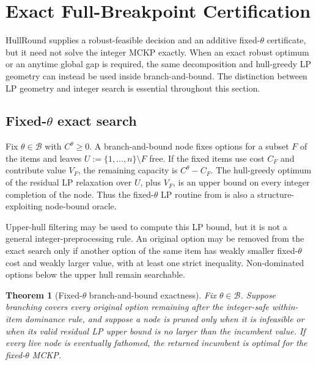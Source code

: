 \documentclass[11pt, a4paper]{article}
\theoremstyle{plain}
\newtheorem{theorem}{Theorem}
\theoremstyle{definition}
\theoremstyle{remark}
\begin{document}
\section{Exact Full-Breakpoint Certification}\label{sec:exact}

HullRound supplies a robust-feasible decision and an additive fixed-$\theta$
certificate, but it need not solve the integer MCKP exactly.  When an exact
robust optimum or an anytime global gap is required, the same decomposition and
hull-greedy LP geometry can instead be used inside branch-and-bound.  The
distinction between LP geometry and integer search is essential throughout this
section.

\subsection{Fixed-\texorpdfstring{$\theta$}{theta} exact search}

Fix $\theta\in\mathcal B$ with $C^\theta\ge0$.  A branch-and-bound node fixes
options for a subset $F$ of the items and leaves $U:=\{1,\ldots,n\}\setminus F$
free.  If the fixed items use cost $C_F$ and contribute value $V_F$, the
remaining capacity is $C^\theta-C_F$.  The hull-greedy optimum of the residual
LP relaxation over $U$, plus $V_F$, is an upper bound on every integer
completion of the node.  Thus the fixed-$\theta$ LP routine from
 is also a structure-exploiting node-bound oracle.

Upper-hull filtering may be used to compute this LP bound, but it is not a
general integer-preprocessing rule.  An original option may be removed from
the exact search only if another option of the same item has weakly smaller
fixed-$\theta$ cost and weakly larger value, with at least one strict
inequality.  Non-dominated options below the upper hull remain searchable.

\begin{theorem}[Fixed-$\theta$ branch-and-bound exactness]\label{thm:fixed_theta_bnb}
Fix $\theta\in\mathcal B$.  Suppose branching covers every original option
remaining after the integer-safe within-item dominance rule, and suppose a node
is pruned only when it is infeasible or when its valid residual LP upper bound
is no larger than the incumbent value.  If every live node is eventually
fathomed, the returned incumbent is optimal for the fixed-$\theta$ MCKP.
\end{theorem}
\end{document}
